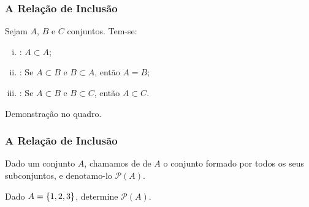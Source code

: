 \documentclass[brazil, notheorems, 10pt]{beamer}
\begin{document}
\begin{frame}
\frametitle{A Relação de Inclusão} %
\begin{Prop}
Sejam $A$, $B$ e $C$ conjuntos. Tem-se:
\begin{enumerate}[i.]
  \item {}: $A \subset A$;
  \item {}: Se $A \subset B$ e $B \subset A$,
  então $A = B$;
  \item {}: Se $A \subset B$ e $B \subset C$,
  então $A \subset C$.
\end{enumerate}
\end{Prop}

Demonstração no quadro.


\end{frame}


\begin{frame}
\frametitle{A Relação de Inclusão} %

\begin{Def}
Dado um conjunto $A$, chamamos de  de $A$ o conjunto formado por todos
os seus subconjuntos, e denotamo-lo $\mathcal{P}(A)$.
\end{Def}

\begin{Exem}
Dado $A = \left\{1, 2, 3\right\}$, determine $\mathcal{P}(A)$.
\end{Exem}



\end{frame}
\end{document}
